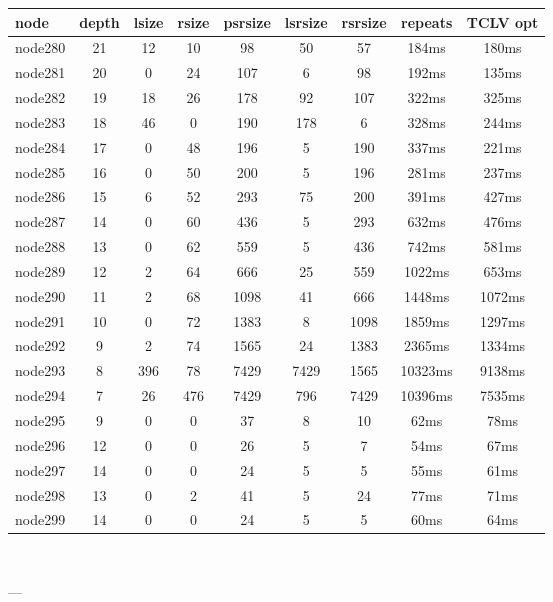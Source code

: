 \begin{tabular}{|l|c|c|c|c|c|c|c|c|}
\hline node & depth & lsize & rsize & psrsize & lsrsize & rsrsize   & repeats & TCLV opt\\
    \hline node280 & 21 & 12 & 10 & 98 & 50 & 57 & 184ms & 180ms\\
    \hline node281 & 20 & 0 & 24 & 107 & 6 & 98 & 192ms & 135ms\\
    \hline node282 & 19 & 18 & 26 & 178 & 92 & 107 & 322ms & 325ms\\
    \hline node283 & 18 & 46 & 0 & 190 & 178 & 6 & 328ms & 244ms\\
    \hline node284 & 17 & 0 & 48 & 196 & 5 & 190 & 337ms & 221ms\\
    \hline node285 & 16 & 0 & 50 & 200 & 5 & 196 & 281ms & 237ms\\
    \hline node286 & 15 & 6 & 52 & 293 & 75 & 200 & 391ms & 427ms\\
    \hline node287 & 14 & 0 & 60 & 436 & 5 & 293 & 632ms & 476ms\\
    \hline node288 & 13 & 0 & 62 & 559 & 5 & 436 & 742ms & 581ms\\
    \hline node289 & 12 & 2 & 64 & 666 & 25 & 559 & 1022ms & 653ms\\
    \hline node290 & 11 & 2 & 68 & 1098 & 41 & 666 & 1448ms & 1072ms\\
    \hline node291 & 10 & 0 & 72 & 1383 & 8 & 1098 & 1859ms & 1297ms\\
    \hline node292 & 9 & 2 & 74 & 1565 & 24 & 1383 & 2365ms & 1334ms\\
    \hline node293 & 8 & 396 & 78 & 7429 & 7429 & 1565 & 10323ms & 9138ms\\
    \hline node294 & 7 & 26 & 476 & 7429 & 796 & 7429 & 10396ms & 7535ms\\
    \hline node295 & 9 & 0 & 0 & 37 & 8 & 10 & 62ms & 78ms\\
    \hline node296 & 12 & 0 & 0 & 26 & 5 & 7 & 54ms & 67ms\\
    \hline node297 & 14 & 0 & 0 & 24 & 5 & 5 & 55ms & 61ms\\
    \hline node298 & 13 & 0 & 2 & 41 & 5 & 24 & 77ms & 71ms\\
    \hline node299 & 14 & 0 & 0 & 24 & 5 & 5 & 60ms & 64ms\\

\hline
\end{tabular} \

---


